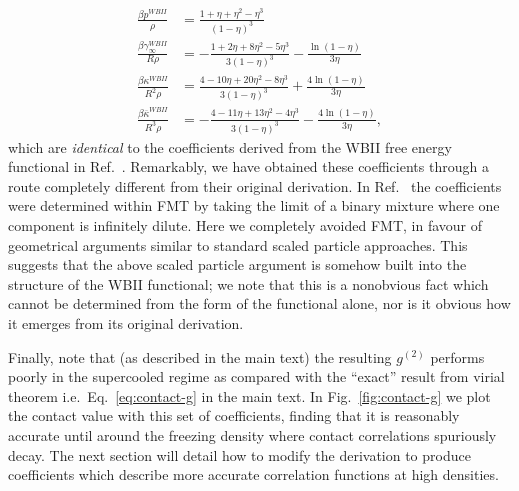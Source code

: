 \documentclass[12pt]{report}
\begin{document}
\begin{subequations}
  \begin{align}
    \frac{\beta p^{WBII}}{\rho} &=
    \frac{1 + \eta + \eta^2 - \eta^3}{(1-\eta)^3}
    \\
    \frac{\beta \gamma_\infty^{WBII}}{R\rho} &=
    -\frac{1 + 2\eta + 8\eta^2 - 5\eta^3}{3(1-\eta)^3}
    - \frac{\ln{(1-\eta)}}{3\eta}
    \\
    \frac{\beta \kappa^{WBII}}{R^2\rho} &=
    \frac{4 - 10\eta + 20\eta^2 - 8\eta^3}{3(1-\eta)^3} + \frac{4 \ln{(1-\eta)}}{3\eta}
    \\
    \frac{\beta \overline{\kappa}^{WBII}}{R^3\rho} &=
    - \frac{4 - 11\eta + 13\eta^2 - 4\eta^3}{3(1-\eta)^3} - \frac{4 \ln{(1-\eta)}}{3\eta},
  \end{align}
\end{subequations}
which are \emph{identical} to the coefficients derived from the WBII free energy functional in Ref.\ \cite{Hansen-Goos2006}.
Remarkably, we have obtained these coefficients through a route completely different from their original derivation.
In Ref.\ \cite{Hansen-Goos2006} the coefficients were determined within FMT by taking the limit of a binary mixture where one component is infinitely dilute.
Here we completely avoided FMT, in favour of geometrical arguments similar to standard scaled particle approaches.
This suggests that the above scaled particle argument is somehow built into the structure of the WBII functional; we note that this is a nonobvious fact which cannot be determined from the form of the functional alone, nor is it obvious how it emerges from its original derivation.

Finally, note that (as described in the main text) the resulting $g^{(2)}$ performs poorly in the supercooled regime as compared with the ``exact'' result from virial theorem i.e.\ Eq.\ \eqref{eq:contact-g} in the main text.
In Fig.\ \ref{fig:contact-g} we plot the contact value with this set of coefficients, finding that it is reasonably accurate until around the freezing density where contact correlations spuriously decay.
The next section will detail how to modify the derivation to produce coefficients which describe more accurate correlation functions at high densities.
\end{document}
